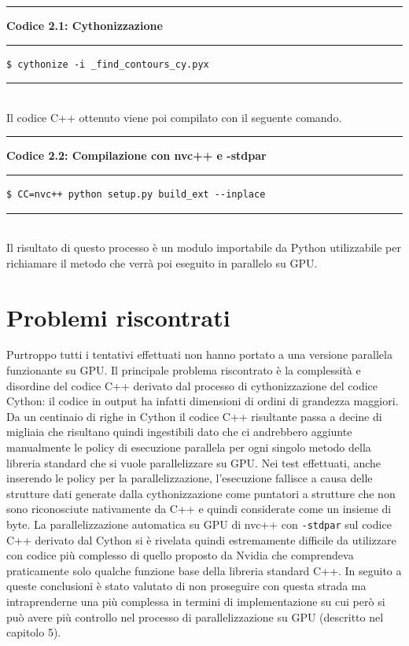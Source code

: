 \documentclass[12pt,a4paper]{report}
\begin{document}
\noindent\rule[0.5ex]{\linewidth}{2pt}
\small{\textbf{Codice 2.1: Cythonizzazione}} \\
\noindent\rule[0.5ex]{\linewidth}{1pt}
\begin{lstlisting}
$ cythonize -i _find_contours_cy.pyx
\end{lstlisting}
\noindent\rule[0.5ex]{\linewidth}{1pt} \\[8pt]
Il codice C++ ottenuto viene poi compilato con il seguente comando.\\[8pt]
\noindent\rule[0.5ex]{\linewidth}{2pt}
\small{\textbf{Codice 2.2: Compilazione con nvc++ e -stdpar}} \\
\noindent\rule[0.5ex]{\linewidth}{1pt}
\begin{lstlisting}
$ CC=nvc++ python setup.py build_ext --inplace
\end{lstlisting}
\noindent\rule[0.5ex]{\linewidth}{1pt} \\[10pt]
Il risultato di questo processo è un modulo importabile da Python utilizzabile per richiamare il metodo che verrà poi eseguito in parallelo su GPU. \newline 

\section{Problemi riscontrati}
Purtroppo tutti i tentativi effettuati non hanno portato a una versione parallela funzionante su GPU. Il principale problema riscontrato è la complessità e disordine del codice C++ derivato dal processo di cythonizzazione del codice Cython: il codice in output ha infatti dimensioni di ordini di grandezza maggiori. Da un centinaio di righe in Cython il codice C++ risultante passa a decine di migliaia che risultano quindi ingestibili dato che ci andrebbero aggiunte manualmente le policy di esecuzione parallela per ogni singolo metodo della libreria standard che si vuole parallelizzare su GPU. Nei test effettuati, anche inserendo le policy per la parallelizzazione, l'esecuzione fallisce a causa delle strutture dati generate dalla cythonizzazione come puntatori a strutture che non sono riconosciute nativamente da C++ e quindi considerate come un insieme di byte. La parallelizzazione automatica su GPU di nvc++ con \verb|-stdpar| sul codice C++ derivato dal Cython si è rivelata quindi estremamente difficile da utilizzare con codice più complesso di quello proposto da Nvidia che comprendeva praticamente solo qualche funzione base della libreria standard C++. 
In seguito a queste conclusioni è stato valutato di non proseguire con questa strada ma intraprenderne una più complessa in termini di implementazione su cui però si può avere più controllo nel processo di parallelizzazione su GPU (descritto nel capitolo 5).
\end{document}
